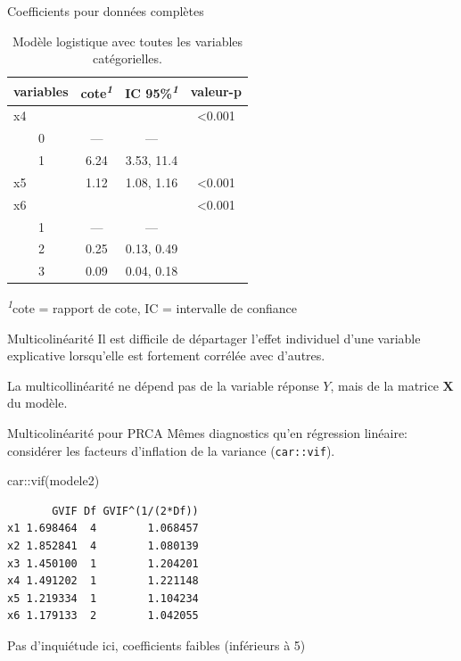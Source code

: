 \documentclass[
  ignorenonframetext,
]{beamer}
\newenvironment{Shaded}{\begin{snugshade}}{\end{snugshade}}
\newcommand{\FunctionTok}[1]{\textcolor[rgb]{0.28,0.35,0.67}{#1}}
\newcommand{\NormalTok}[1]{\textcolor[rgb]{0.00,0.23,0.31}{#1}}
\newcommand{\SpecialCharTok}[1]{\textcolor[rgb]{0.37,0.37,0.37}{#1}}
\begin{document}
\begin{frame}{Coefficients pour données complètes}
\protect\hypertarget{coefficients-pour-donnuxe9es-compluxe8tes-1}{}
\footnotesize

\hypertarget{tbl-logit1-complet2}{}
\setlength{\LTpost}{0mm}
\begin{longtable}{lccc}
\caption{\label{tbl-logit1-complet2}Modèle logistique avec toutes les variables catégorielles. }\tabularnewline

\toprule
variables & cote\textsuperscript{\textit{1}} & IC 95\%\textsuperscript{\textit{1}} & valeur-p \\ 
\midrule
x4 &  &  & <0.001 \\ 
    0 & — & — &  \\ 
    1 & 6.24 & 3.53, 11.4 &  \\ 
x5 & 1.12 & 1.08, 1.16 & <0.001 \\ 
x6 &  &  & <0.001 \\ 
    1 & — & — &  \\ 
    2 & 0.25 & 0.13, 0.49 &  \\ 
    3 & 0.09 & 0.04, 0.18 &  \\ 
\bottomrule
\end{longtable}
\begin{minipage}{\linewidth}
\textsuperscript{\textit{1}}cote = rapport de cote, IC = intervalle de confiance\\
\end{minipage}
\end{frame}

\begin{frame}{Multicolinéarité}
\protect\hypertarget{multicolinuxe9arituxe9}{}
Il est difficile de départager l'effet individuel d'une variable
explicative lorsqu'elle est fortement corrélée avec d'autres.

La multicollinéarité ne dépend pas de la variable réponse \(Y\), mais de
la matrice \(\mathbf{X}\) du modèle.
\end{frame}

\begin{frame}[fragile]{Multicolinéarité pour PRCA}
\protect\hypertarget{multicolinuxe9arituxe9-pour-prca}{}
Mêmes diagnostics qu'en régression linéaire: considérer les facteurs
d'inflation de la variance (\texttt{car::vif}).

\begin{Shaded}
\begin{Highlighting}[numbers=left,,]
\NormalTok{car}\SpecialCharTok{::}\FunctionTok{vif}\NormalTok{(modele2)}
\end{Highlighting}
\end{Shaded}

\begin{verbatim}
       GVIF Df GVIF^(1/(2*Df))
x1 1.698464  4        1.068457
x2 1.852841  4        1.080139
x3 1.450100  1        1.204201
x4 1.491202  1        1.221148
x5 1.219334  1        1.104234
x6 1.179133  2        1.042055
\end{verbatim}

Pas d'inquiétude ici, coefficients faibles (inférieurs à 5)
\end{frame}
\end{document}
